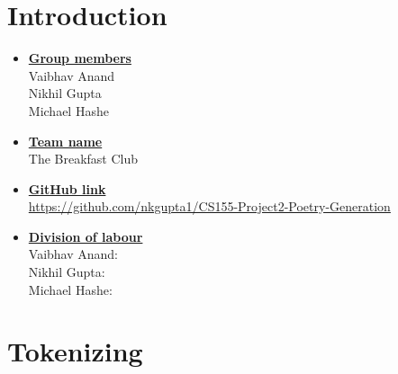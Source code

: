 \newif\ifshowsolutions
\showsolutionstrue

\newcommand{\boldline}[1]{\underline{\textbf{#1}}}


\usepackage{amsfonts} %
\usepackage{amsmath} %
\usepackage{longtable} %
\usepackage{enumitem}
\usepackage{graphicx} %
\graphicspath{{figures/}} %
\usepackage{makecell}
\usepackage[margin=2.25cm]{caption}


\pagestyle{fancy}

\section{Introduction}
\medskip
\begin{itemize}

    \item \boldline{Group members} \\
    Vaibhav Anand \\
    Nikhil Gupta \\
    Michael Hashe
    
    \item \boldline{Team name} \\
    The Breakfast Club

    \item \boldline{GitHub link} \\
    \href{https://github.com/nkgupta1/CS155-Project2-Poetry-Generation}{https://github.com/nkgupta1/CS155-Project2-Poetry-Generation}
    
    \item \boldline{Division of labour} \\
    Vaibhav Anand: \\
    Nikhil Gupta: \\
    Michael Hashe: 

\end{itemize}

\section{Tokenizing}
\medskip

